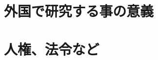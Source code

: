 \documentclass[11pt,a4paper,uplatex,twoside,dvipdfmx]{ujarticle} 	%
\newcommand{\研究課題名}{\mgfamily ストカスティック形式、原始ブラックホール、重力波観測から迫るインフレーション}
\newcommand{\研究機関名}{\mgfamily 名古屋大学}
\newcommand{\申請者氏名}{\mgfamily 多田 祐一郎}
\newcommand{\研究代表者氏名}{\申請者氏名}
\newcommand{\研究期間の最終元号年度}{34}	%
\begin{document}
\section{外国で研究する事の意義}
\newcommand{\外国で研究する事の意義}{%
	
	\begin{mdframed}[roundcorner=0.5zw,
	innertopmargin=0.8zw,innerbottommargin=0.8zw,
	linecolor=black!50,linewidth=0.2zw,
	backgroundcolor=black!10]
	{\bfseries\gtfamily\sffamily\large ① 研究関連性}
	\end{mdframed}
	
	blahblah...
	
	
	\begin{mdframed}[roundcorner=0.5zw,
	innertopmargin=0.8zw,innerbottommargin=0.8zw,
	linecolor=black!50,linewidth=0.2zw,
	backgroundcolor=black!10]
	{\bfseries\gtfamily\sffamily\large ② 派遣の意義}
	\end{mdframed}
	
	blahblah...
	

	
}

\section{人権、法令など}
\end{document}
